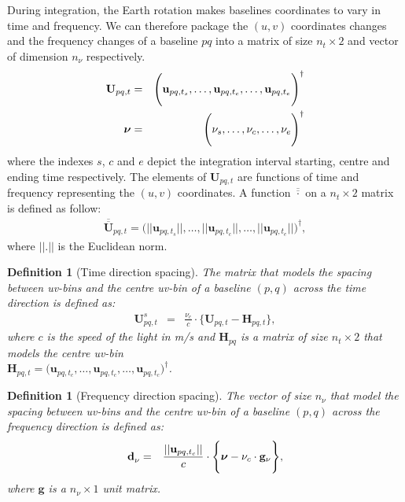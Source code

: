 \documentclass[useAMS,usenatbib]{mn2e}
\newtheorem{definition}[theorem]{Definition}
\begin{document}
During integration, the Earth rotation makes baselines coordinates  to vary in time and 
frequency. We can therefore package the $(u,v)$ coordinates changes and the frequency changes of a baseline $pq$ into a matrix of 
size $n_t \times 2$ and  vector of dimension $n_{\nu}$ respectively. 
\begin{eqnarray*}
\mathbf{U}_{pq,t}&=& \Bigg(\mathbf{u}_{pq,t_s}, \dots , \mathbf{u}_{pq,t_c}, \dots, \mathbf{u}_{pq,t_e}\Bigg)^{\dagger}\\
 \mbox{\boldmath $\nu$}&=&\Bigg(\nu_s,\dots,\nu_c,\dots,\nu_e\Bigg)^{\dagger}
\end{eqnarray*}
where the indexes $s$, $c$ and $e$ depict the integration interval starting, centre and ending time respectively. 
The 
elements of $\mathbf{U}_{pq,t}$ are functions of time and frequency representing the $(u,v)$ coordinates.
A function $\overline{\overline{\cdot}}$ on a $n_t \times 2$ matrix is defined as follow:
\begin{eqnarray}
\overline{\overline{\mathbf{U}}}_{pq,t}=\Bigg(||\mathbf{u}_{pq,t_s}||, \dots , ||\mathbf{u}_{pq,t_c}||, \dots, 
||\mathbf{u}_{pq,t_e}||\Bigg)^{\dagger},
\end{eqnarray}
where $||.||$ is the Euclidean norm.
\begin{definition}[Time direction spacing]
\label{def:1}
The matrix that models the spacing between uv-bins and the centre uv-bin of a baseline $(p,q)$ across the time 
direction is defined as:
\begin{eqnarray*}
 \mathbf{U}_{pq,t}^{s} &=&\frac{\nu_c}{c}\cdot\Bigg\{\mathbf{U}_{pq,t}-\mathbf{H}_{pq,t} \Bigg \},
\end{eqnarray*}
where $c$ is the speed of the light in m/s and $\mathbf{H}_{pq}$ is a matrix of size $n_t \times 2$ that models the centre uv-bin\\
$\mathbf{H}_{pq,t}= \big(\mathbf{u}_{pq,t_c}, \dots , \mathbf{u}_{pq,t_c}, \dots, \mathbf{u}_{pq,t_c}\big)^{\dagger}$.
\end{definition}
\begin{definition}[Frequency direction spacing]
\label{def:2}
The vector of size $n_{\nu}$ that model the spacing between uv-bins and the centre uv-bin of a baseline $(p,q)$ 
across the frequency direction is defined as:
\begin{eqnarray*}
\mathbf{d}^{}_{\nu} &=&\frac{||\textbf{u}_{pq,t_c}||}{c}\cdot\Bigg\{\mbox{\boldmath 
$\nu$}-\nu_c\cdot\mathbf{g}_{\nu} \Bigg \},
\end{eqnarray*}
where  $\textbf{g}$ is a $n_{\nu}\times1$ unit matrix. 
\end{definition}
\end{document}
